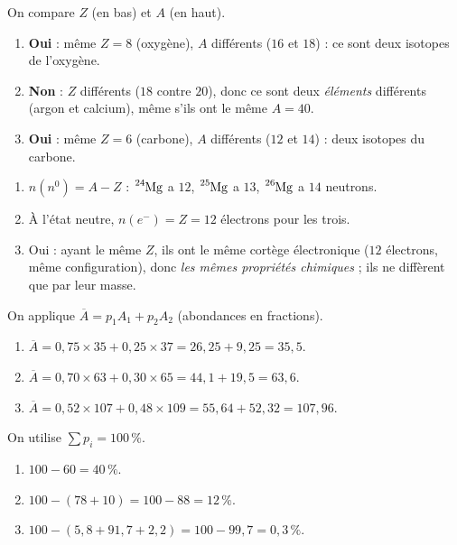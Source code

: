 \documentclass[11pt,a4paper]{article}
\begin{document}
\begin{corrige}
On compare $Z$ (en bas) et $A$ (en haut).
\begin{enumerate}[label=\alph*)]
  \item \textbf{Oui} : même $Z=8$ (oxygène), $A$ différents ($16$ et $18$) : ce sont deux isotopes de
        l'oxygène.
  \item \textbf{Non} : $Z$ différents ($18$ contre $20$), donc ce sont deux \emph{éléments} différents
        (argon et calcium), même s'ils ont le même $A=40$.
  \item \textbf{Oui} : même $Z=6$ (carbone), $A$ différents ($12$ et $14$) : deux isotopes du carbone.
\end{enumerate}
\end{corrige}

\begin{corrige}
\begin{enumerate}[label=\alph*)]
  \item $n(n^0) = A - Z$ : $\ce{^{24}Mg}$ a $12$, $\ce{^{25}Mg}$ a $13$, $\ce{^{26}Mg}$ a $14$ neutrons.
  \item À l'état neutre, $n(e^-) = Z = 12$ électrons pour les trois.
  \item Oui : ayant le même $Z$, ils ont le même cortège électronique ($12$ électrons, même
        configuration), donc \emph{les mêmes propriétés chimiques} ; ils ne diffèrent que par leur masse.
\end{enumerate}
\end{corrige}

\begin{corrige}
On applique $\overline{A} = p_1 A_1 + p_2 A_2$ (abondances en fractions).
\begin{enumerate}[label=\alph*)]
  \item $\overline{A} = 0{,}75\times 35 + 0{,}25\times 37 = 26{,}25 + 9{,}25 = 35{,}5$.
  \item $\overline{A} = 0{,}70\times 63 + 0{,}30\times 65 = 44{,}1 + 19{,}5 = 63{,}6$.
  \item $\overline{A} = 0{,}52\times 107 + 0{,}48\times 109 = 55{,}64 + 52{,}32 = 107{,}96$.
\end{enumerate}
\end{corrige}

\begin{corrige}
On utilise $\sum p_i = 100\,\%$.
\begin{enumerate}[label=\alph*)]
  \item $100 - 60 = 40\,\%$.
  \item $100 - (78 + 10) = 100 - 88 = 12\,\%$.
  \item $100 - (5{,}8 + 91{,}7 + 2{,}2) = 100 - 99{,}7 = 0{,}3\,\%$.
\end{enumerate}
\end{corrige}
\end{document}
